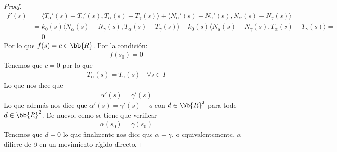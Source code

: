\begin{teo}
\begin{proof}
\begin{align*}
            f'(s) &= \langle T_\alpha'(s) - T_\gamma'(s), T_\alpha(s)-T_\gamma(s) \rangle + \langle N_\alpha'(s) - N_\gamma'(s), N_\alpha(s)-N_\gamma(s) \rangle = \\
            &= k_0(s) \langle N_\alpha(s) - N_\gamma(s), T_\alpha(s)-T_\gamma(s) \rangle - k_0(s) \langle N_\alpha(s) - N_\gamma(s), T_\alpha(s)-T_\gamma(s) \rangle =\\
            &= 0
        \end{align*}
        Por lo que $f(s)=c\in \bb{R}$. Por la condición:
        \begin{gather*}
            f(s_0) = 0
        \end{gather*}
        Tenemos que $c=0$ por lo que 
        \begin{gather*}
            T_\alpha(s) = T_\gamma(s)\ \ \ \ \forall s \in I
        \end{gather*}
        Lo que nos dice que 
        \begin{gather*}
            \alpha'(s) = \gamma'(s)
        \end{gather*}
        Lo que además nos dice que $\alpha'(s) = \gamma'(s) + d$ con $d\in \bb{R}^2$ para todo $d\in \bb{R}^2$. De nuevo, como se tiene que verificar
        \begin{gather*}
            \alpha(s_0) = \gamma(s_0)
        \end{gather*}
        Tenemos que $d=0$ lo que finalmente nos dice que $\alpha = \gamma$, o equivalentemente, $\alpha$ difiere de $\beta$ en un movimiento rígido directo.        
    \end{proof} 
\end{teo}


